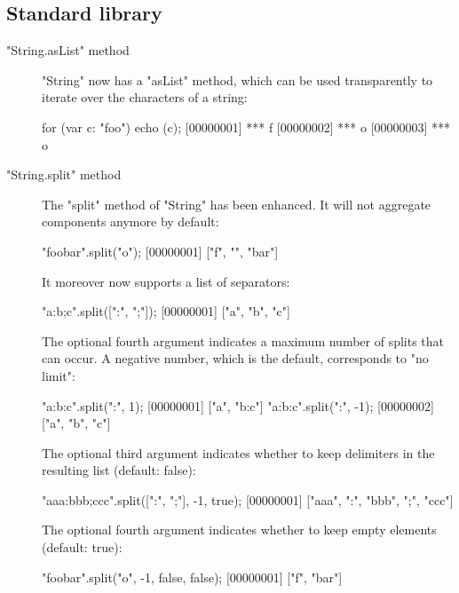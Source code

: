 \subsection{Standard library}
\begin{description}

\item["String.asList" method]

"String" now has a "asList" method, which can be used transparently
to iterate over the characters of a string:

\begin{urbiscript}
for (var c: "foo") echo (c);
[00000001] *** f
[00000002] *** o
[00000003] *** o
\end{urbiscript}

\item["String.split" method]

The "split" method of "String" has been enhanced. It will not aggregate
components anymore by default:

\begin{urbiscript}
"foobar".split("o");
[00000001] ["f", "", "bar"]
\end{urbiscript}

It moreover now supports a list of separators:

\begin{urbiscript}
"a:b;c".split([":", ";"]);
[00000001] ["a", "b", "c"]
\end{urbiscript}

The optional fourth argument indicates a maximum number of splits that
can occur. A negative number, which is the default, corresponds to
"no limit":

\begin{urbiscript}
"a:b:c".split(":", 1);
[00000001] ["a", "b:c"]
"a:b:c".split(":", -1);
[00000002] ["a", "b", "c"]
\end{urbiscript}

The optional third argument indicates whether to keep delimiters in
the resulting list (default: false):

\begin{urbiscript}
"aaa:bbb;ccc".split([":", ";"], -1, true);
[00000001] ["aaa", ":", "bbb", ";", "ccc"]
\end{urbiscript}

The optional fourth argument indicates whether to keep empty elements
(default: true):

\begin{urbiscript}
"foobar".split("o", -1, false, false);
[00000001] ["f", "bar"]
\end{urbiscript}


\end{description}
